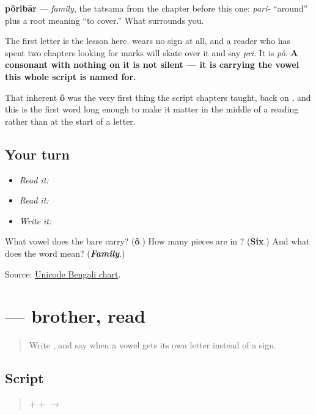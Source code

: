 \textbf{pôribār} — \emph{family}, the tatsama from the chapter before this one: \emph{pari-} \textquotedblleft{}around\textquotedblright{} plus a root meaning \textquotedblleft{}to cover.\textquotedblright{} What surrounds you.

The first letter is the lesson here. \textbf{} wears no sign at all, and a reader who has spent two chapters looking for marks will skate over it and say \emph{pri}. It is \emph{pô}. \textbf{A consonant with nothing on it is not silent — it is carrying the vowel this whole script is named for.}

That inherent \textbf{ô} was the very first thing the script chapters taught, back on \textbf{}, and this is the first word long enough to make it matter in the middle of a reading rather than at the start of a letter.

\subsection*{Your turn}
\begin{itemize}
\raggedright
  \item \emph{Read it:} 
  \item \emph{Read it:} 
  \item \emph{Write it:} 
\end{itemize}

\begin{tcolorbox}[breakable,colback=teal!4,colframe=teal!35!black,title={Before you move on}]
What vowel does the bare \textbf{} carry? (\textbf{ô}.) How many pieces are in \textbf{}? (\textbf{Six}.) And what does the word mean? (\emph{\textbf{Family}}.)

Source: \href{https://www.unicode.org/charts/PDF/U0980.pdf}{Unicode Bengali chart}.
\end{tcolorbox}
\section[bhāi]{ — brother, read}

\label{lesson:BN-W04-bhai-read}



\begin{quote}
Write \textbf{}, and say when a vowel gets its own letter instead of a sign.
\end{quote}

\subsection*{Script}
\begin{quote}
\textbf{} + \textbf{} + \textbf{} $\to$ \textbf{}
\end{quote}

